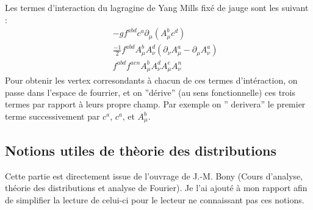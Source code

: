 \documentclass[a4paper,11pt]{article} %
\theoremstyle{plain}
\theoremstyle{definition}
\theoremstyle{remark}
\numberwithin{equation}{section}
\numberwithin{equation}{subsection}
\numberwithin{figure}{section}
\begin{document}
\noindent
Les termes d'interaction du lagragine de Yang Mills fixé de jauge sont les suivant :
\begin{eqnarray*}
 &&  -g f^{abd} c^{a}  \partial_{\mu} \left( A^{b}_{\mu} c^{d} \right)  \\
 &&  \frac{-1}{2}  f^{abd}  A^{b}_{\mu}A^{d}_{\nu}  \left(   \partial_{\nu}A^{a}_{\mu} - \partial_{\mu}A^{a}_{\nu} \right)  \\
 && f^{abd}  f^{aen}  A^{b}_{\mu}A^{d}_{\nu}  A^{e}_{\mu}A^{n}_{\nu} 
\end{eqnarray*}
Pour obtenir les vertex corresondants à chacun de ces termes d'intéraction, on passe dans l'espace de fourrier, et on ''dérive'' 
(au sens fonctionnelle) ces trois termes  par rapport à leurs propre champ. Par exemple on '' derivera'' le premier terme successivement 
par $c^{a}$, $c^{a}$, et $A^{b}_{\mu}$.

\subsection{Notions utiles de thèorie des distributions}

\noindent
Cette partie est directement issue de l'ouvrage de J.-M. Bony (Cours d'analyse, théorie des distributions et analyse de Fourier). Je 
l'ai ajouté à mon rapport afin de simplifier la lecture de celui-ci pour le lecteur ne connaissant pas ces notions. \\
\end{document}
